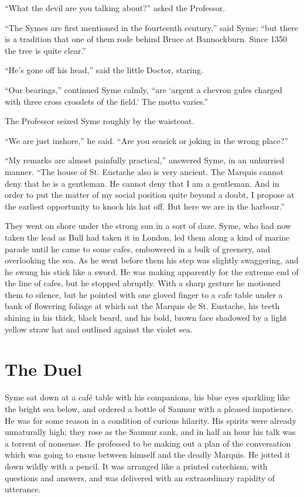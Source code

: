 \documentclass{book}
\begin{document}
“What the devil are you talking about?” asked the Professor.

“The Symes are first mentioned in the fourteenth century,” said Syme; “but there is a tradition that one of them rode behind Bruce at Bannockburn. Since 1350 the tree is quite clear.”

“He’s gone off his head,” said the little Doctor, staring.

“Our bearings,” continued Syme calmly, “are ‘argent a chevron gules charged with three cross crosslets of the field.’ The motto varies.”

The Professor seized Syme roughly by the waistcoat.

“We are just inshore,” he said. “Are you seasick or joking in the wrong place?”

“My remarks are almost painfully practical,” answered Syme, in an unhurried manner. “The house of St. Eustache also is very ancient. The Marquis cannot deny that he is a gentleman. He cannot deny that I am a gentleman. And in order to put the matter of my social position quite beyond a doubt, I propose at the earliest opportunity to knock his hat off. But here we are in the harbour.”

They went on shore under the strong sun in a sort of daze. Syme, who had now taken the lead as Bull had taken it in London, led them along a kind of marine parade until he came to some cafes, embowered in a bulk of greenery, and overlooking the sea. As he went before them his step was slightly swaggering, and he swung his stick like a sword. He was making apparently for the extreme end of the line of cafes, but he stopped abruptly. With a sharp gesture he motioned them to silence, but he pointed with one gloved finger to a cafe table under a bank of flowering foliage at which sat the Marquis de St. Eustache, his teeth shining in his thick, black beard, and his bold, brown face shadowed by a light yellow straw hat and outlined against the violet sea.

\chapter{The Duel}
\label{chapter-9}
Syme sat down at a café table with his companions, his blue eyes sparkling like the bright sea below, and ordered a bottle of Saumur with a pleased impatience. He was for some reason in a condition of curious hilarity. His spirits were already unnaturally high; they rose as the Saumur sank, and in half an hour his talk was a torrent of nonsense. He professed to be making out a plan of the conversation which was going to ensue between himself and the deadly Marquis. He jotted it down wildly with a pencil. It was arranged like a printed catechism, with questions and answers, and was delivered with an extraordinary rapidity of utterance.
\end{document}
